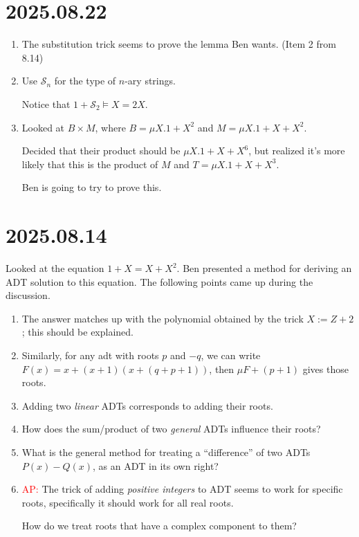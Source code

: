\documentclass[letterpaper,numbers=enddot]{scrartcl}
\newcommand{\mcS}{\mathcal{S}}
\newcommand{\hired}[1]{\textcolor{Red}{#1}}
\begin{document}
\section*{2025.08.22}
\begin{enumerate}
  \item The substitution trick seems to prove the lemma Ben wants.
  (Item 2 from 8.14)
  \item Use $\mcS_n$ for the type of $n$-ary strings.

  Notice that $1 + \mcS_2 \models X = 2X$.

  \item Looked at $B \times M$, where $B = \mu X. 1 + X^2$ and $M = \mu X. 1 + X + X^2$.

  Decided that their product should be $\mu X. 1 + X + X^6$, but realized it's more likely
  that this is the product of $M$ and $T = \mu X. 1 + X + X^3$.

  Ben is going to try to prove this.
\end{enumerate}

\section*{2025.08.14}

Looked at the equation $1 + X = X + X^2$.
Ben presented a method for deriving an ADT solution to this equation.
The following points came up during the discussion.
\begin{enumerate}
  \item The answer matches up with the polynomial obtained by the trick
  $X := Z + 2$; this should be explained.
  \item Similarly, for any adt with roots $p$ and $-q$, we can
  write $F(x) = x + (x+1)(x+(q+p+1))$, then $\mu F + (p+1)$ gives those roots.
  \item Adding two \emph{linear} ADTs corresponds to adding their roots.
  \item How does the sum/product of two \emph{general} ADTs influence their
  roots?
  \item What is the general method for treating a ``difference'' of two
  ADTs $P(x) - Q(x)$, as an ADT in its own right?
  \item \hired{AP:} The trick of adding \emph{positive integers} to ADT
  seems to work for specific roots, specifically it should work for all real roots.

  How do we treat roots that have a complex component to them?
\end{enumerate}
\end{document}
